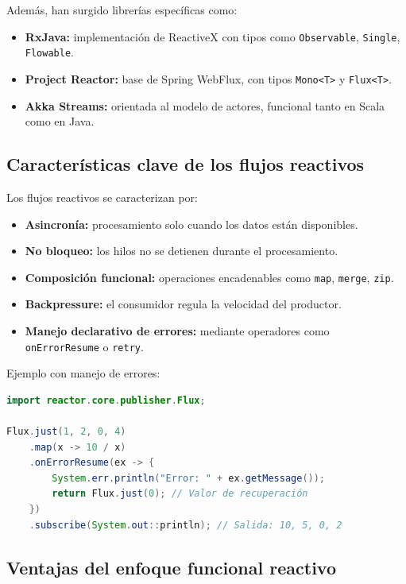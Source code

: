 Además, han surgido librerías específicas como:

\begin{itemize}
    \item \textbf{RxJava:} implementación de ReactiveX con tipos como \texttt{Observable}, \texttt{Single}, \texttt{Flowable}.
    \item \textbf{Project Reactor:} base de Spring WebFlux, con tipos \texttt{Mono<T>} y \texttt{Flux<T>}.
    \item \textbf{Akka Streams:} orientada al modelo de actores, funcional tanto en Scala como en Java.
\end{itemize}

\subsection{Características clave de los flujos reactivos}

Los flujos reactivos se caracterizan por:

\begin{itemize}
    \item \textbf{Asincronía:} procesamiento solo cuando los datos están disponibles.
    \item \textbf{No bloqueo:} los hilos no se detienen durante el procesamiento.
    \item \textbf{Composición funcional:} operaciones encadenables como \texttt{map}, \texttt{merge}, \texttt{zip}.
    \item \textbf{Backpressure:} el consumidor regula la velocidad del productor.
    \item \textbf{Manejo declarativo de errores:} mediante operadores como \texttt{onErrorResume} o \texttt{retry}.
\end{itemize}

\vspace{0.5em}
\noindent Ejemplo con manejo de errores:

\begin{lstlisting}[language=Java, caption={Manejo de errores en flujo reactivo}, label={lst:error_handling}]
import reactor.core.publisher.Flux;

Flux.just(1, 2, 0, 4)
    .map(x -> 10 / x)
    .onErrorResume(ex -> {
        System.err.println("Error: " + ex.getMessage());
        return Flux.just(0); // Valor de recuperación
    })
    .subscribe(System.out::println); // Salida: 10, 5, 0, 2
\end{lstlisting}

\subsection{Ventajas del enfoque funcional reactivo}

